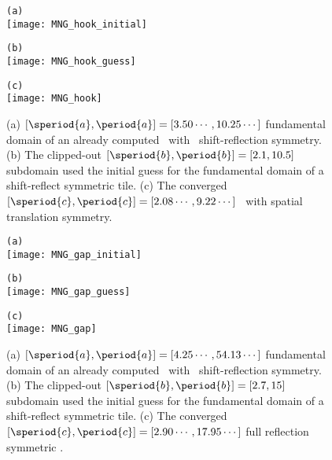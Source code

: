 \begin{description}
{\begin{figure}
\begin{minipage}[height=.1\textheight]{.5\textwidth}
\centering \small{\texttt{(a)}}\\
\texttt{[image: MNG\_hook\_initial]}
\end{minipage}
\begin{minipage}[height=.1\textheight]{.5\textwidth}
\centering \small{\texttt{(b)}}\\
\texttt{[image: MNG\_hook\_guess]}
\end{minipage}
\begin{minipage}[height=.1\textheight]{\textwidth}
\centering \small{\texttt{(c)}}\\
\texttt{[image: MNG\_hook]}
\end{minipage}
\caption{ \label{fig:hook}
(a)
$[\speriod{a},\period{a}]=[3.50\cdots,10.25\cdots]$ fundamental domain
of an already computed \twot\ with \spt\ shift-reflection symmetry.
(b)
The clipped-out $[\speriod{b},\period{b}]=[2.1,10.5]$ subdomain used the
initial guess for the fundamental domain of a shift-reflect symmetric tile.
(c)
The converged $[\speriod{c},\period{c}]=[2.08\cdots,9.22\cdots]$  \twot\
with spatial translation symmetry.
}
\end{figure}

\begin{figure}
\begin{minipage}[height=.3\textheight]{.5\textwidth}
\centering \small{\texttt{(a)}}\\
\texttt{[image: MNG\_gap\_initial]}
\end{minipage}
\begin{minipage}[height=.3\textheight]{.5\textwidth}
\centering \small{\texttt{(b)}}\\
\texttt{[image: MNG\_gap\_guess]}
\end{minipage}
\begin{minipage}[height=.1\textheight]{\textwidth}
\centering \small{\texttt{(c)}}\\
\texttt{[image: MNG\_gap]}
\end{minipage}
\caption{ \label{fig:gap}
(a)
$[\speriod{a},\period{a}]=[4.25\cdots,54.13\cdots]$ fundamental domain
of an already computed \twot\ with \spt\ shift-reflection symmetry.
(b)
The clipped-out $[\speriod{b},\period{b}]=[2.7,15]$ subdomain used the
initial guess for the fundamental domain of a shift-reflect symmetric tile.
(c)
The converged $[\speriod{c},\period{c}]=[2.90\cdots,17.95\cdots]$ full
reflection symmetric \twot.
}
\end{figure}

}
\end{description}
